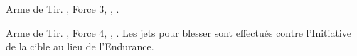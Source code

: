 \closearmyspecialrules




\vspace*{1.5cm}
\startarmyarmoury

\startitemlistonecol

\listitemonecol{\repeatercrossbow} Arme de Tir. , Force 3, , .

\listitemonecol{\petrifyingstare} Arme de Tir. , Force 4, , . Les jets pour blesser sont effectués contre l'Initiative de la cible au lieu de l'Endurance.

\enditemlistonecol

\closearmyarmoury





